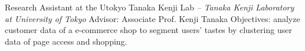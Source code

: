 \documentclass[letterpaper,MMMyyyy,nonstop]{simpleresumecv}
\begin{document}
\begin{body}
\BigGapNoBreak

Research Assistant at the Utokyo Tanaka Kenji Lab
\hfill
\textit{ -- }
\newline
\textit{Tanaka Kenji Laboratory at University of Tokyo}
\newline
Advisor: Associate Prof. Kenji Tanaka
\newline
Objectives: analyze customer data of a e-commerce shop to segment users' tastes by clustering
user data of page access and shopping.

%
%
%
%
%
%


\end{body}
\end{document}
